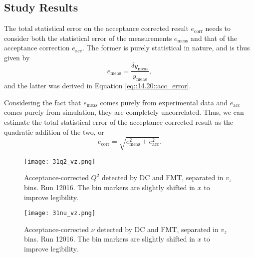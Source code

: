 \subsection{Study Results}
\label{14.30::study_results}

    The total statistical error on the acceptance corrected result $e_\text{corr}$ needs to consider both the statistical error of the measurements $e_\text{meas}$ and that of the acceptance correction $e_\text{acc}$.
    The former is purely statistical in nature, and is thus given by
    \begin{equation*}
        e_\text{meas} = \frac{\delta y_\text{meas}}{y_\text{meas}},
    \end{equation*}
    and the latter was derived in Equation \eqref{eq::14.20::acc_error}.

    Considering the fact that $e_\text{meas}$ comes purely from experimental data and $e_\text{acc}$ comes purely from simulation, they are completely uncorrelated.
    Thus, we can estimate the total statistical error of the acceptance corrected result as the quadratic addition of the two, or
    \begin{equation*}
        e_\text{corr} = \sqrt{e_\text{meas}^2 + e_\text{acc}^2}.
    \end{equation*}


    
    

    \begin{figure}
        \centering
        \texttt{[image: 31q2\_vz.png]}
        \caption[Acceptance-corrected $Q^2$ separated in $v_z$ bins]
        {Acceptance-corrected $Q^2$ detected by DC and FMT, separated in $v_z$ bins.
        Run 12016.
        The bin markers are slightly shifted in $x$ to improve legibility.}
        \label{fig::14.31::q2_vz}
    \end{figure}

    \begin{figure}
        \centering
        \texttt{[image: 31nu\_vz.png]}
        \caption[Acceptance-corrected $\nu$ separated in $v_z$ bins]
        {Acceptance-corrected $\nu$ detected by DC and FMT, separated in $v_z$ bins.
        Run 12016.
        The bin markers are slightly shifted in $x$ to improve legibility.}
        \label{fig::14.31::nu_vz}
    \end{figure}

